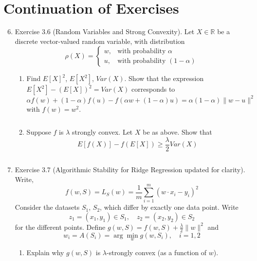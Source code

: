 \documentclass[
10pt, %
a4paper, %
oneside, %
headinclude,footinclude, %
BCOR5mm, %
]{scrartcl}
\begin{document}

\section*{Continuation of Exercises}

\begin{enumerate}
\setcounter{enumi}{5}
    \item Exercise 3.6 (Random Variables and Strong Convexity). Let $X \in \mathbb{R}$ be a discrete vector-valued random variable, with distribution
    \[
    \rho(X) =
    \begin{cases}
      w, & \text{with probability }\alpha \\
      u, & \text{with probability }(1 - \alpha)
    \end{cases}
    \]
    \begin{enumerate}
        \item Find $E[X]^2$, $E[X^2]$, $Var(X)$. Show that the expression $E[X^2] - (E[X])^2 = Var(X)$ corresponds to
        \[
        \alpha f(w) + (1 - \alpha) f(u) - f(\alpha w + (1 - \alpha) u) = \alpha (1 - \alpha) \|w - u\|^2
        \]
        with $f(w) = w^2$.

        \[\] %

        \item Suppose $f$ is $\lambda$ strongly convex. Let $X$ be as above. Show that
        \[
        E[f(X)] - f(E[X]) \geq \frac{\lambda}{2} Var(X)
        \]

        \[\] %
    \end{enumerate}

    \item Exercise 3.7 (Algorithmic Stability for Ridge Regression updated for clarity). Write,
    \[
    f(w, S) = L_S(w) = \frac{1}{m} \sum_{i=1}^{m} (w \cdot x_i - y_i)^2
    \]
    Consider the datasets $S_1$, $S_2$, which differ by exactly one data point. Write
    \[
    z_1 = (x_1, y_1) \in S_1, \quad z_2 = (x_2, y_2) \in S_2
    \]
    for the different points. Define $g(w, S) = f(w, S) + \frac{\lambda}{2} \|w\|^2$ and
    \[
    w_i = A(S_i) = \arg\min_w g(w, S_i), \quad i = 1, 2
    \]
    \begin{enumerate}
        \item Explain why $g(w, S)$ is $\lambda$-strongly convex (as a function of $w$).

        \[\] %


\end{enumerate}
\end{enumerate}
\end{document}
